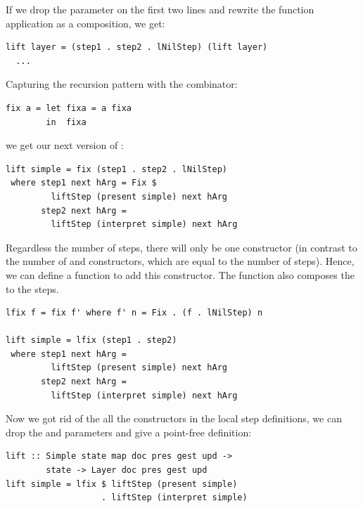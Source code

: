 \documentclass[preprint,natbib]{sigplanconf}
\begin{document}
If we drop the  parameter on the first two lines and rewrite the function application as a composition, we get:
\
\begin{small}
\begin{verbatim}
lift layer = (step1 . step2 . lNilStep) (lift layer)
  ...
\end{verbatim}
\end{small}

\noindent Capturing the recursion pattern with the  combinator:

\begin{small}
\begin{verbatim}
fix a = let fixa = a fixa
        in  fixa
\end{verbatim}
\end{small}

we get our next version of :

\begin{small} %
\begin{verbatim}
lift simple = fix (step1 . step2 . lNilStep)
 where step1 next hArg = Fix $
         liftStep (present simple) next hArg
       step2 next hArg =
         liftStep (interpret simple) next hArg
\end{verbatim}
\end{small}%


Regardless the number of steps, there will only be one  constructor (in contrast to the number of  and  constructors, which are equal to the number of steps). Hence, we can define a function  to add this constructor. The function  also composes the  to the steps. 

\begin{small}%
\begin{verbatim}
lfix f = fix f' where f' n = Fix . (f . lNilStep) n

lift simple = lfix (step1 . step2)
 where step1 next hArg = 
         liftStep (present simple) next hArg
       step2 next hArg = 
         liftStep (interpret simple) next hArg
\end{verbatim}
\end{small}

Now we got rid of the all the constructors in the local step definitions, we can drop the  and  parameters and give a point-free definition:

\begin{small} %
\begin{verbatim}
lift :: Simple state map doc pres gest upd ->
        state -> Layer doc pres gest upd
lift simple = lfix $ liftStep (present simple) 
                   . liftStep (interpret simple)
\end{verbatim}%
\end{small}
\end{document}
